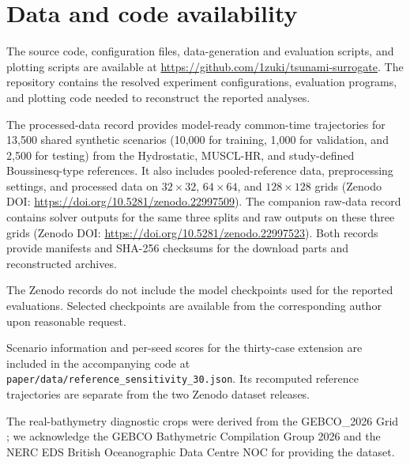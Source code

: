 \section*{Data and code availability}
The source code, configuration files, data-generation and evaluation scripts, and plotting scripts are available at \url{https://github.com/1zuki/tsunami-surrogate}. The repository contains the resolved experiment configurations, evaluation programs, and plotting code needed to reconstruct the reported analyses.

The processed-data record provides model-ready common-time trajectories for 13,500 shared synthetic scenarios (10,000 for training, 1,000 for validation, and 2,500 for testing) from the Hydrostatic, MUSCL-HR, and study-defined Boussinesq-type references. It also includes pooled-reference data, preprocessing settings, and processed data on $32 \times 32$, $64 \times 64$, and $128 \times 128$ grids (Zenodo DOI: \url{https://doi.org/10.5281/zenodo.22997509}). The companion raw-data record contains solver outputs for the same three splits and raw outputs on these three grids (Zenodo DOI: \url{https://doi.org/10.5281/zenodo.22997523}). Both records provide manifests and SHA-256 checksums for the download parts and reconstructed archives.

The Zenodo records do not include the model checkpoints used for the reported evaluations. Selected checkpoints are available from the corresponding author upon reasonable request.

Scenario information and per-seed scores for the thirty-case extension are included in the accompanying code at \nolinkurl{paper/data/reference_sensitivity_30.json}. Its recomputed reference trajectories are separate from the two Zenodo dataset releases.

The real-bathymetry diagnostic crops were derived from the GEBCO\_2026 Grid \citep{gebco2026}; we acknowledge the GEBCO Bathymetric Compilation Group 2026 and the NERC EDS British Oceanographic Data Centre NOC for providing the dataset.
